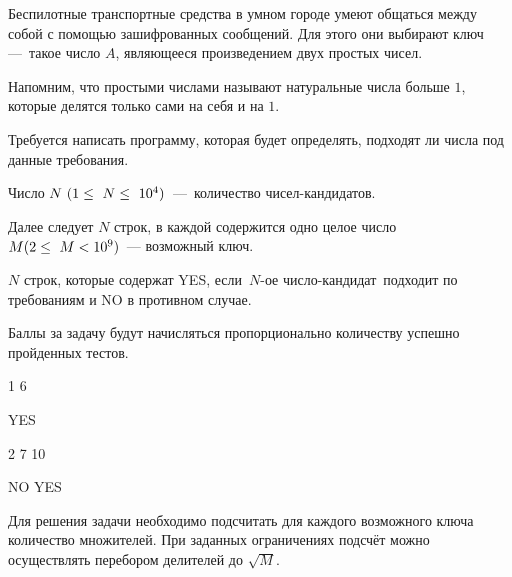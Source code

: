 
Беспилотные транспортные средства в умном городе умеют общаться между собой с помощью зашифрованных сообщений. Для этого они выбирают ключ — такое число $A$, являющееся произведением двух простых чисел.

Напомним, что простыми числами называют натуральные числа больше $1$, которые делятся только сами на себя и на $1$.

Требуется написать программу, которая будет определять, подходят ли числа под данные требования.


Число $N\space (1 \leq N \leq 10^4)$ — количество чисел-кандидатов.

Далее следует $N$ строк, в каждой содержится одно целое число\\ $ M\space (2 \leq M < 10^9)$ — возможный ключ.

\outputfmtSection

$N$ строк, которые содержат YES, если $N$-ое число-кандидат подходит по требованиям и NO в противном случае.

\markSection

Баллы за задачу будут начисляться пропорционально количеству успешно пройденных тестов.


\begin{myverbbox}[\small]{\vinput}
    1
    6
\end{myverbbox}
\begin{myverbbox}[\small]{\voutput}
    YES
\end{myverbbox}


\begin{myverbbox}[\small]{\vinput}
    2
    7
    10
\end{myverbbox}
\begin{myverbbox}[\small]{\voutput}
    NO
    YES
\end{myverbbox}

\solutionSection

Для решения задачи необходимо подсчитать для каждого возможного ключа количество множителей. При заданных ограничениях подсчёт можно осуществлять перебором делителей до $\sqrt{M}$.

